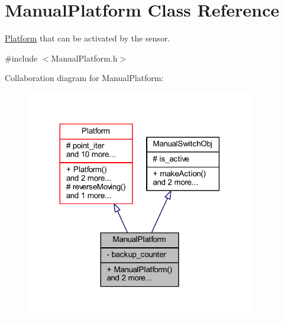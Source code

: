\hypertarget{class_manual_platform}{}\section{Manual\+Platform Class Reference}
\label{class_manual_platform}


\hyperlink{class_platform}{Platform} that can be activated by the sensor.  




{\ttfamily \#include $<$Manual\+Platform.\+h$>$}



Collaboration diagram for Manual\+Platform\+:
\nopagebreak
\begin{figure}[H]
\begin{center}
\leavevmode
\includegraphics[width=282pt]{class_manual_platform__coll__graph}
\end{center}
\end{figure}
